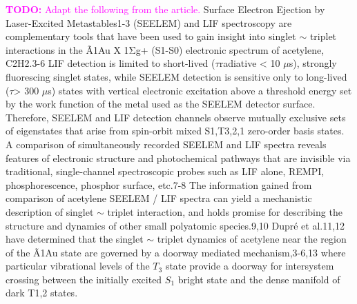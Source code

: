 \documentclass[12pt]{mitthesis}
\newcommand{\TODO} [1]{\textcolor{magenta}{\textbf{TODO:} #1}}
\begin{document}
\TODO{Adapt the following from the article.}  Surface Electron
Ejection by Laser-Excited Metastables1-3 (SEELEM) and LIF spectroscopy
are complementary tools that have been used to gain insight into
singlet $\sim$ triplet interactions in the Ã1Au X 1Σg+ (S1-S0) electronic
spectrum of acetylene, C2H2.3-6 LIF detection is limited to
short-lived ($\tau$radiative < 10 $\mu$s), strongly fluorescing singlet
states, while SEELEM detection is sensitive only to long-lived ($\tau$>
300 $\mu$s) states with vertical electronic excitation above a threshold
energy set by the work function of the metal used as the SEELEM
detector surface. Therefore, SEELEM and LIF detection channels observe
mutually exclusive sets of eigenstates that arise from spin-orbit
mixed S1,T3,2,1 zero-order basis states.  A comparison of
simultaneously recorded SEELEM and LIF spectra reveals features of
electronic structure and photochemical pathways that are invisible via
traditional, single-channel spectroscopic probes such as LIF alone,
REMPI, phosphorescence, phosphor surface, etc.7-8 The information
gained from comparison of acetylene SEELEM / LIF spectra can yield a
mechanistic description of singlet $\sim$ triplet interaction, and holds
promise for describing the structure and dynamics of other small
polyatomic species.9,10 Dupré et al.11,12 have determined that the
singlet $\sim$ triplet dynamics of acetylene near the region of the Ã1Au
state are governed by a doorway mediated mechanism,3-6,13 where
particular vibrational levels of the $T_3$ state provide a doorway for
intersystem crossing between the initially excited $S_1$ bright state and
the dense manifold of dark T1,2 states.
\end{document}

